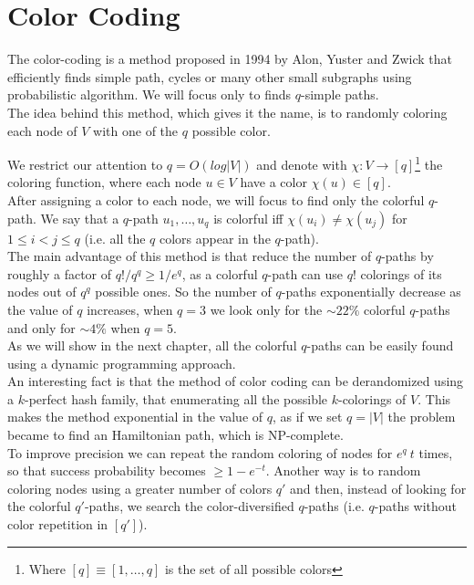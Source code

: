 \section{Color Coding}

The color-coding is a method proposed in 1994 by Alon, Yuster and Zwick that efficiently finds simple path, cycles or many other small subgraphs using probabilistic algorithm. We will focus only to finds $q$-simple paths.\\

The idea behind this method, which gives it the name, is to randomly coloring each node of $V$ with one of the $q$ possible color.

We restrict our attention to $q = O(log |V|)$ and denote with $\chi : V \rightarrow [q]$\footnote{Where $[q] \equiv [1, \ldots, q]$ is the set of all possible colors} the coloring function, where each node $u \in V$ have a color $\chi(u) \in [q]$.\\

After assigning a color to each node, we will focus to find only the colorful $q$-path. We say that a $q$-path $u_{1}, \ldots, u_{q}$ is colorful iff $\chi(u_{i}) \neq \chi(u_{j})$ for $1 \leq i < j \leq q$ (i.e. all the $q$ colors appear in the $q$-path).\\

The main advantage of this method is that reduce the number of $q$-paths by roughly a factor of $q! / q^{q} \geq 1/e^{q}$, as a colorful $q$-path can use $q!$ colorings of its nodes out of $q^{q}$ possible ones. So the number of $q$-paths exponentially decrease as the value of $q$ increases, when $q = 3$ we look only for the $\sim22\%$ colorful $q$-paths and only for $\sim4\%$ when $q = 5$.\\

As we will show in the next chapter, all the colorful $q$-paths can be easily found using a dynamic programming approach.\\

An interesting fact is that the method of color coding can be derandomized using a $k$-perfect hash family, that enumerating all the possible $k$-colorings of $V$.
This makes the method exponential in the value of $q$, as if we set $q = |V|$ the problem became to find an Hamiltonian path, which is NP-complete.\\

To improve precision we can repeat the random coloring of nodes for $e^{q}\ t$ times, 
so that success probability becomes $\geq 1-e^{-t}$. 
Another way is to random coloring nodes using a greater number of colors $q'$ and then, instead of looking for the colorful $q'$-paths,
we search the color-diversified $q$-paths (i.e. $q$-paths without color repetition in $[q']$).\\

